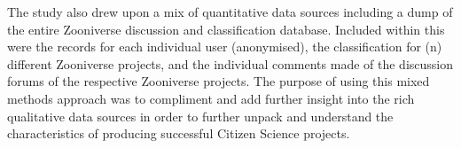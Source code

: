 \documentclass{sigchi}
\begin{document}
The study also drew upon a mix of quantitative data sources including a dump of the entire Zooniverse discussion and classification database. Included within this were the records for each individual user (anonymised), the classification for (n) different Zooniverse projects, and the individual comments made of the discussion forums of the respective Zooniverse projects. The purpose of using this mixed methods approach was to compliment and add further insight into the rich qualitative data sources \cite{EdwardsCrossley2009} in order to further unpack and understand the characteristics of producing successful Citizen Science projects.



\end{document}
